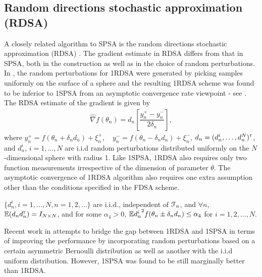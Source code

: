 \subsection{Random directions stochastic approximation (RDSA)}
A closely related algorithm to SPSA is the random directions stochastic approximation (RDSA) \cite[pp.~58-60]{kushcla}. The gradient estimate in RDSA differs from that in SPSA, both in the construction as well as in the choice of random perturbations.  In \cite{kushcla}, the random perturbations for 1RDSA were generated by picking samples uniformly on the surface of a sphere and the resulting 1RDSA scheme was found to be  inferior to 1SPSA from an asymptotic convergence rate viewpoint - see \cite{chin1997comparative}.  
The RDSA estimate of the gradient is given by
\begin{align}
\label{eq:grad-unif}
\widehat\nabla f(\theta_n) = d_n \left[ \dfrac{y_n^+ - y_n^-}{2\delta_n}\right],
\end{align}
where $y_{n}^+ = f(\theta_n+\delta_n d_n) + \xi_{n}^+,\quad y_{n}^- = f(\theta_n-\delta_n d_n) + \xi_{n}^-$, $d_n = (d_n^i,\ldots,d_n^N)^\mathsf{\scriptscriptstyle T}$, and $d_n^i$, $ i=1,\ldots,N$ are i.i.d random perturbations distributed uniformly on the $N$-dimensional sphere with radius 1. Like 1SPSA, 1RDSA also requires only two function measurements irrespective of the dimension of parameter $\theta$. 
The asymptotic convergence of 1RDSA algorithm also requires one extra assumption other than the conditions specified in the FDSA scheme. 
\begin{pvn}
\item $\{ d_{n}^i, i=1,\ldots,N, n=1,2,\ldots\}$ are i.i.d., independent of $\mathcal{F}_n$, and $\forall n$, $\mathbb{E} (d_{n} d_{n}^\mathsf{\scriptscriptstyle T}) = I_{N \times N}$, and for some $\alpha_4 > 0$, $\mathbb{E} {d_{n}^i}^2 f(\theta_n \pm \delta_n d_n) \le \alpha_4$ for $i=1,2,\ldots,N$.
\end{pvn}
Recent work in \cite{prashanth2015rdsa} attempts to bridge the gap between 1RDSA and 1SPSA in terms of improving the performance by incorporating random perturbations based on a certain asymmetric Bernoulli
distribution as well as another with the  i.i.d uniform distribution. However,  1SPSA was found to be still marginally better than 1RDSA.  
